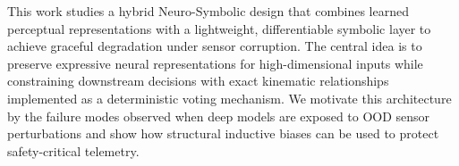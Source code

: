 This work studies a hybrid Neuro-Symbolic design that combines learned perceptual representations with a lightweight, differentiable symbolic layer to achieve graceful degradation under sensor corruption. The central idea is to preserve expressive neural representations for high-dimensional inputs while constraining downstream decisions with exact kinematic relationships implemented as a deterministic voting mechanism. We motivate this architecture by the failure modes observed when deep models are exposed to OOD sensor perturbations and show how structural inductive biases can be used to protect safety-critical telemetry.
